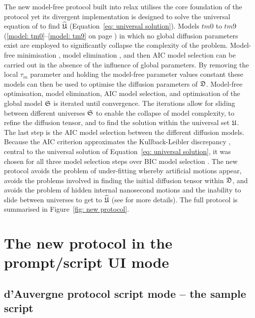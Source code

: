 \begin{htmlonly}
\begin{htmlonly}
The new model-free protocol built into relax utilises the core foundation of the \citet{Butterwick04} protocol yet its divergent implementation is designed to solve the universal equation of \citet{dAuvergneGooley07} to find $\widehat{\mathfrak{U}}$ (Equation~\ref{eq: universal solution}).
Models $tm0$ to $tm9$ (\ref{model: tm0}--\ref{model: tm9} on page \pageref{model: tm0}) in which no global diffusion parameters exist are employed to significantly collapse the complexity of the problem.
Model-free minimisation \citep{dAuvergneGooley08a}, model elimination \citep{dAuvergneGooley06}, and then AIC model selection \citep{Akaike73, dAuvergneGooley03} can be carried out in the absence of the influence of global parameters.
By removing the local $\tau_m$ parameter and holding the model-free parameter values constant these models can then be used to optimise the diffusion parameters of $\mathfrak{D}$.
Model-free optimisation, model elimination, AIC model selection, and optimisation of the global model $\mathfrak{S}$ is iterated until convergence.
The iterations allow for sliding between different universes $\mathfrak{S}$ to enable the collapse of model complexity, to refine the diffusion tensor, and to find the solution within the universal set $\mathfrak{U}$.
The last step is the AIC model selection between the different diffusion models.
Because the AIC criterion approximates the Kullback-Leibler discrepancy \citep{KullbackLeibler51}, central to the universal solution of Equation~\eqref{eq: universal solution}, it was chosen for all three model selection steps over BIC model selection \citep{Schwarz78, dAuvergneGooley03, Chen04}.
The new protocol avoids the problem of under-fitting whereby artificial motions appear, avoids the problems involved in finding the initial diffusion tensor within $\mathfrak{D}$, and avoids the problem of hidden internal nanosecond motions and the inability to slide between universes to get to $\widehat{\mathfrak{U}}$ (see \citet{dAuvergneGooley07} for more details).
The full protocol is summarised in Figure~\ref{fig: new protocol}.



\newpage
\section{The new protocol in the prompt/script UI mode}



\subsection{d'Auvergne protocol script mode -- the sample script}


\end{htmlonly}
\end{htmlonly}
